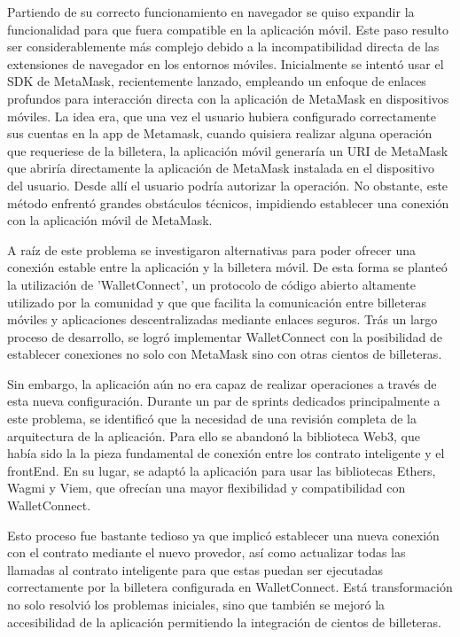 Partiendo de su correcto funcionamiento en navegador se quiso expandir la funcionalidad para que fuera compatible en la aplicación móvil.
Este paso resulto ser considerablemente más complejo debido a la incompatibilidad directa de las extensiones de navegador en los entornos móviles. 
Inicialmente se intentó usar el SDK de MetaMask, recientemente lanzado, empleando un enfoque de enlaces profundos para interacción directa con la aplicación de MetaMask en dispositivos móviles.
La idea era, que una vez el usuario hubiera configurado correctamente sus cuentas en la app de Metamask, cuando quisiera realizar alguna operación que requeriese de la billetera, la aplicación móvil generaría un URI de MetaMask que abriría directamente la aplicación de MetaMask instalada en el dispositivo del usuario. Desde allí el usuario podría autorizar la operación.
No obstante, este método enfrentó grandes obstáculos técnicos, impidiendo establecer una conexión con la aplicación móvil de MetaMask.

A raíz de este problema se investigaron alternativas para poder ofrecer una conexión estable entre la aplicación y la billetera móvil. De esta forma se planteó la utilización de 'WalletConnect', un protocolo de código abierto altamente utilizado por la comunidad y que que facilita la comunicación entre billeteras móviles y aplicaciones descentralizadas mediante enlaces seguros. Trás un largo proceso de desarrollo, se logró implementar WalletConnect con la posibilidad de establecer conexiones no solo con MetaMask sino con otras cientos de billeteras.

Sin embargo, la aplicación aún no era capaz de realizar operaciones a través de esta nueva configuración. Durante un par de sprints dedicados principalmente a este problema, se identificó que la necesidad de una revisión completa de la arquitectura de la aplicación. 
Para ello se abandonó la biblioteca Web3, que había sido la la pieza fundamental de conexión entre los contrato inteligente y el frontEnd.
En su lugar, se adaptó la aplicación para usar las bibliotecas Ethers, Wagmi y Viem, que ofrecían una mayor flexibilidad y compatibilidad con WalletConnect.

Esto proceso fue bastante tedioso ya que implicó establecer una nueva conexión con el contrato mediante el nuevo provedor, así como actualizar todas las llamadas al contrato inteligente para que estas puedan ser ejecutadas correctamente por la billetera configurada en WalletConnect.
Está transformación no solo resolvió los problemas iniciales, sino que también se mejoró la accesibilidad de la aplicación permitiendo la integración de cientos de billeteras.



